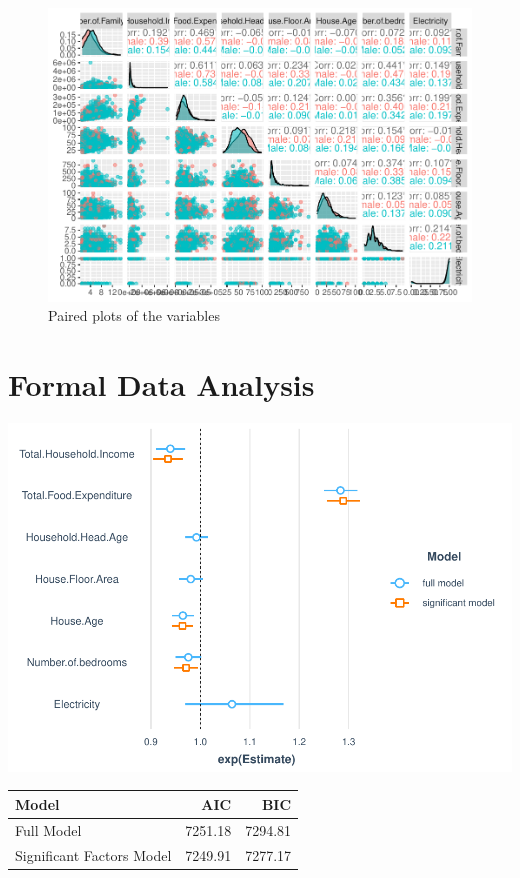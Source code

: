 \documentclass[
]{article}
\begin{document}
\begin{figure}

{\centering \includegraphics[width=1\linewidth]{Group_01_Project2_demo_files/figure-latex/pairs-1} 

}

\caption{Paired plots of the variables}\label{fig:pairs}
\end{figure}

\hypertarget{sec:FDA}{%
\section{Formal Data Analysis}\label{sec:FDA}}

\includegraphics{Group_01_Project2_demo_files/figure-latex/unnamed-chunk-1-1.pdf}

\begin{table}[H]
\centering
\begin{tabular}{lrr}
\toprule
Model & AIC & BIC\\
\midrule
Full Model & 7251.18 & 7294.81\\
Significant Factors Model & 7249.91 & 7277.17\\
\bottomrule
\end{tabular}
\end{table}
\end{document}

